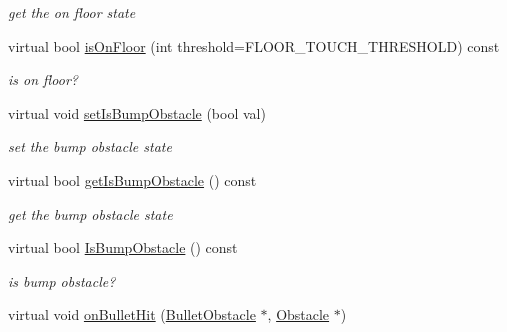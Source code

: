 \begin{DoxyCompactItemize}
\begin{DoxyCompactList}\small\item\em get the on floor state \end{DoxyCompactList}\item 
virtual bool \hyperlink{class_n_c_t_u_1_1_obstacle_ae419fab10dbf0d0a12fd2648ac4e2d52}{is\+On\+Floor} (int threshold=F\+L\+O\+O\+R\+\_\+\+T\+O\+U\+C\+H\+\_\+\+T\+H\+R\+E\+S\+H\+O\+LD) const \hypertarget{class_n_c_t_u_1_1_obstacle_ae419fab10dbf0d0a12fd2648ac4e2d52}{}\label{class_n_c_t_u_1_1_obstacle_ae419fab10dbf0d0a12fd2648ac4e2d52}

\begin{DoxyCompactList}\small\item\em is on floor? \end{DoxyCompactList}\item 
virtual void \hyperlink{class_n_c_t_u_1_1_obstacle_a72befedacbcc24f006b6e6e06be49cf5}{set\+Is\+Bump\+Obstacle} (bool val)\hypertarget{class_n_c_t_u_1_1_obstacle_a72befedacbcc24f006b6e6e06be49cf5}{}\label{class_n_c_t_u_1_1_obstacle_a72befedacbcc24f006b6e6e06be49cf5}

\begin{DoxyCompactList}\small\item\em set the bump obstacle state \end{DoxyCompactList}\item 
virtual bool \hyperlink{class_n_c_t_u_1_1_obstacle_a6a6cd290bd731357b99d9f94925632fb}{get\+Is\+Bump\+Obstacle} () const \hypertarget{class_n_c_t_u_1_1_obstacle_a6a6cd290bd731357b99d9f94925632fb}{}\label{class_n_c_t_u_1_1_obstacle_a6a6cd290bd731357b99d9f94925632fb}

\begin{DoxyCompactList}\small\item\em get the bump obstacle state \end{DoxyCompactList}\item 
virtual bool \hyperlink{class_n_c_t_u_1_1_obstacle_a22fcf620d1a4592c3cce9dac4f344555}{Is\+Bump\+Obstacle} () const \hypertarget{class_n_c_t_u_1_1_obstacle_a22fcf620d1a4592c3cce9dac4f344555}{}\label{class_n_c_t_u_1_1_obstacle_a22fcf620d1a4592c3cce9dac4f344555}

\begin{DoxyCompactList}\small\item\em is bump obstacle? \end{DoxyCompactList}\item 
virtual void \hyperlink{class_n_c_t_u_1_1_obstacle_a28463f2b0bd1a97128757b58d848bf1f}{on\+Bullet\+Hit} (\hyperlink{class_n_c_t_u_1_1_bullet_obstacle}{Bullet\+Obstacle} $\ast$, \hyperlink{class_n_c_t_u_1_1_obstacle}{Obstacle} $\ast$)\hypertarget{class_n_c_t_u_1_1_obstacle_a28463f2b0bd1a97128757b58d848bf1f}{}\label{class_n_c_t_u_1_1_obstacle_a28463f2b0bd1a97128757b58d848bf1f}


\end{DoxyCompactItemize}
